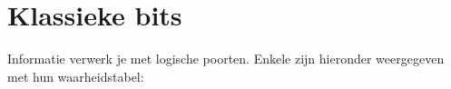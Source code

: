 \documentclass[../../main.tex]{subfiles}
\begin{document}
\onlyinsubfile{
\setcounter{chapter}{0}
}
\notinsubfile{}
\section{Klassieke bits}\label{sec:wbklassiek}

Informatie verwerk je met logische poorten. Enkele zijn hieronder weergegeven met hun waarheidstabel:
\end{document}

